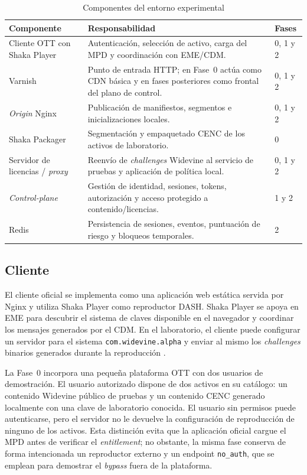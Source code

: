 \begin{table}[H]
\centering
\caption{Componentes del entorno experimental}
\label{tab:componentes-laboratorio}
\begin{tabularx}{\textwidth}{p{}Yp{0.18\textwidth}}
\toprule
\textbf{Componente} & \textbf{Responsabilidad} & \textbf{Fases} \\
\midrule
Cliente OTT con Shaka Player & Autenticación, selección de activo, carga del MPD y coordinación con EME/CDM. & 0, 1 y 2 \\
Varnish & Punto de entrada HTTP; en Fase~0 actúa como CDN básica y en fases posteriores como frontal del plano de control. & 0, 1 y 2 \\
\textit{Origin} Nginx & Publicación de manifiestos, segmentos e inicializaciones locales. & 0, 1 y 2 \\
Shaka Packager & Segmentación y empaquetado CENC de los activos de laboratorio. & 0 \\
Servidor de licencias / \textit{proxy} & Reenvío de \textit{challenges} Widevine al servicio de pruebas y aplicación de política local. & 0, 1 y 2 \\
\textit{Control-plane} & Gestión de identidad, sesiones, tokens, autorización y acceso protegido a contenido/licencias. & 1 y 2 \\
Redis & Persistencia de sesiones, eventos, puntuación de riesgo y bloqueos temporales. & 2 \\
\bottomrule
\end{tabularx}
\end{table}

\subsection{Cliente}

El cliente oficial se implementa como una aplicación web estática servida por Nginx y utiliza Shaka Player como reproductor DASH. Shaka Player se apoya en EME para descubrir el sistema de claves disponible en el navegador y coordinar los mensajes generados por el CDM. En el laboratorio, el cliente puede configurar un servidor para el sistema \nolinkurl{com.widevine.alpha} y enviar al mismo los \textit{challenges} binarios generados durante la reproducción \cite{w3ceme2026,shaka-packager-docs}.

La Fase~0 incorpora una pequeña plataforma OTT con dos usuarios de demostración. El usuario autorizado dispone de dos activos en su catálogo: un contenido Widevine público de pruebas y un contenido CENC generado localmente con una clave de laboratorio conocida. El usuario sin permisos puede autenticarse, pero el servidor no le devuelve la configuración de reproducción de ninguno de los activos. Esta distinción evita que la aplicación oficial cargue el MPD antes de verificar el \textit{entitlement}; no obstante, la misma fase conserva de forma intencionada un reproductor externo y un endpoint \nolinkurl{no_auth}, que se emplean para demostrar el \textit{bypass} fuera de la plataforma.

